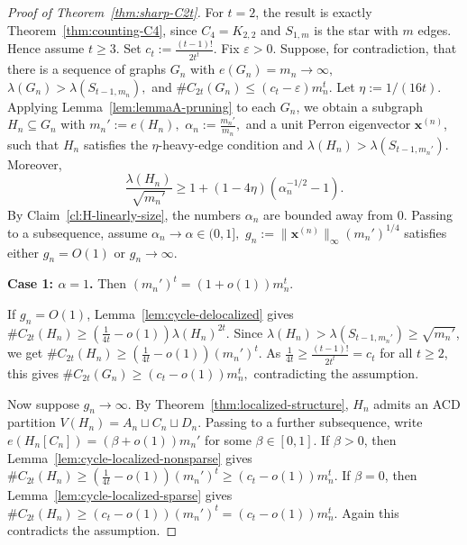 \documentclass[11pt]{article}
\theoremstyle{definition}
\theoremstyle{plain}
\begin{document}
\begin{proof}[Proof of Theorem~\ref{thm:sharp-C2t}]
For \(t=2\), the result is exactly Theorem~\ref{thm:counting-C4}, since
\(C_4=K_{2,2}\) and \(S_{1,m}\) is the star with \(m\) edges.  Hence
assume \(t\ge3\).  Set $c_t:=\frac{(t-1)!}{2t^t}.$
Fix \(\varepsilon>0\).  Suppose, for contradiction, that there is a
sequence of graphs \(G_n\) with
$e(G_n)=m_n\to\infty,$ $\lambda(G_n)>\lambda(S_{t-1,m_n}),$ 
and $\texttt{\#}C_{2t}(G_n)\le (c_t-\varepsilon)m_n^t.$
Let \(\eta:=1/(16t)\).  Applying Lemma~\ref{lem:lemmaA-pruning} to each
\(G_n\), we obtain a subgraph \(H_n\subseteq G_n\) with
$m_n':=e(H_n),$ $
        \alpha_n:=\frac{m_n'}{m_n},$
and a unit Perron eigenvector \(\bm{x}^{(n)}\), such that \(H_n\)
satisfies the \(\eta\)-heavy-edge condition and
$\lambda(H_n)>\lambda(S_{t-1,m_n'}).$
Moreover,
\[
        \frac{\lambda(H_n)}{\sqrt{m_n'}}
        \ge
        1+(1-4\eta)(\alpha_n^{-1/2}-1).
\]
By Claim~\ref{cl:H-linearly-size}, the numbers \(\alpha_n\) are bounded
away from \(0\).  Passing to a subsequence, assume
$\alpha_n\to\alpha\in(0,1],$ $       g_n:=\|\bm{x}^{(n)}\|_\infty(m_n')^{1/4}$
satisfies either \(g_n=O(1)\) or \(g_n\to\infty\).

\smallskip
\noindent\textbf{Case 1: \(\alpha=1\).}
Then \((m_n')^t=(1+o(1))m_n^t\).

If \(g_n=O(1)\), Lemma~\ref{lem:cycle-delocalized} gives
$\texttt{\#}C_{2t}(H_n)
        \ge
        \left(\frac{1}{4t}-o(1)\right)\lambda(H_n)^{2t}.$
Since \(\lambda(H_n)>\lambda(S_{t-1,m_n'})\ge\sqrt{m_n'}\), we get
$\texttt{\#}C_{2t}(H_n)
        \ge
        \left(\frac{1}{4t}-o(1)\right)(m_n')^t.$
As
$        \frac{1}{4t}\ge \frac{(t-1)!}{2t^t}=c_t$
for all \(t\ge2\), this gives $
        \texttt{\#}C_{2t}(G_n)
        \ge
        (c_t-o(1))m_n^t,$
contradicting the assumption.

Now suppose \(g_n\to\infty\).  By Theorem~\ref{thm:localized-structure},
\(H_n\) admits an ACD partition
$V(H_n)=A_n\sqcup C_n\sqcup D_n.$
Passing to a further subsequence, write
$        e(H_n[C_n])=(\beta+o(1))m_n'$
for some \(\beta\in[0,1]\).  If \(\beta>0\), then
Lemma~\ref{lem:cycle-localized-nonsparse} gives
        $\texttt{\#}C_{2t}(H_n)
        \ge
        \left(\frac{1}{4t}-o(1)\right)(m_n')^t
        \ge
        (c_t-o(1))m_n^t.$
If \(\beta=0\), then Lemma~\ref{lem:cycle-localized-sparse} gives
$\texttt{\#}C_{2t}(H_n)
        \ge
        (c_t-o(1))(m_n')^t
        =
        (c_t-o(1))m_n^t.
$
Again this contradicts the assumption.


\end{proof}
\end{document}
